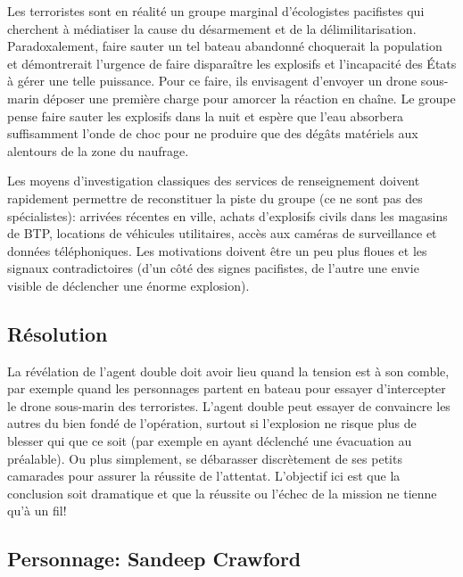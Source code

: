 Les \og terroristes \fg sont en réalité un groupe marginal d'écologistes pacifistes qui cherchent à médiatiser la cause du désarmement et de la délimilitarisation.
Paradoxalement, faire sauter un tel bateau abandonné choquerait la population et démontrerait l'urgence de faire disparaître les explosifs et l'incapacité des États à gérer une telle puissance.
Pour ce faire, ils envisagent d'envoyer un drone sous-marin déposer une première charge pour amorcer la réaction en chaîne.
Le groupe pense faire sauter les explosifs dans la nuit et espère que l'eau absorbera suffisamment l'onde de choc pour ne produire que des dégâts matériels aux alentours de la zone du naufrage.

Les moyens d'investigation classiques des services de renseignement doivent rapidement permettre de reconstituer la piste du groupe (ce ne sont pas des spécialistes): arrivées récentes en ville, achats d'explosifs civils dans les magasins de BTP, locations de véhicules utilitaires, accès aux caméras de surveillance et données téléphoniques.
Les motivations doivent être un peu plus floues et les signaux contradictoires (d'un côté des signes pacifistes, de l'autre une envie visible de déclencher une énorme explosion).

\subsection{Résolution}

La révélation de l'agent double doit avoir lieu quand la tension est à son comble, par exemple quand les personnages partent en bateau pour essayer d'intercepter le drone sous-marin des terroristes.
L'agent double peut essayer de convaincre les autres du bien fondé de l'opération, surtout si l'explosion ne risque plus de blesser qui que ce soit (par exemple en ayant déclenché une évacuation au préalable).
Ou plus simplement, se débarasser discrètement de ses petits camarades pour assurer la réussite de l'attentat.
L'objectif ici est que la conclusion soit dramatique et que la réussite ou l'échec de la mission ne tienne qu'à un fil!

\subsection*{Personnage: Sandeep Crawford}


